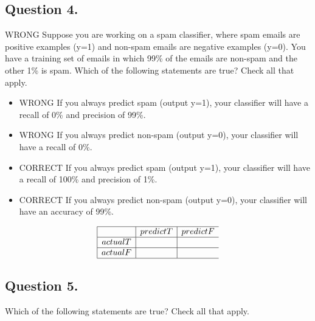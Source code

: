 \documentclass[11pt]{article} %
\begin{document}
\subsection*{Question 4.} WRONG
Suppose you are working on a spam classifier, where spam emails are positive examples (y=1) and non-spam emails are
negative examples (y=0). You have a training set of emails in which 99\% of the emails are non-spam and the other 1\% is
spam. Which of the following statements are true? Check all that apply.

\begin{itemize}
	\item WRONG If you always predict spam (output y=1), your classifier will have a recall of 0\% and precision of 99\%.
	
	
	\item WRONG If you always predict non-spam (output y=0), your classifier will have a recall of 0\%.
	
	
	\item CORRECT If you always predict spam (output y=1), your classifier will have a recall of 100\% and precision of 1\%.
	
	
	
	\item CORRECT If you always predict non-spam (output y=0), your classifier will have an accuracy of 99\%.
\end{itemize}

\[\begin{array}{|c|c|c} \hline 
&   predict T	& predict F\\ \hline
actual T &	&  \\ \hline 
actual F & &  \\ \hline
\end{array} \]


\subsection*{Question 5.}

Which of the following statements are true? Check all that apply.
\end{document}
